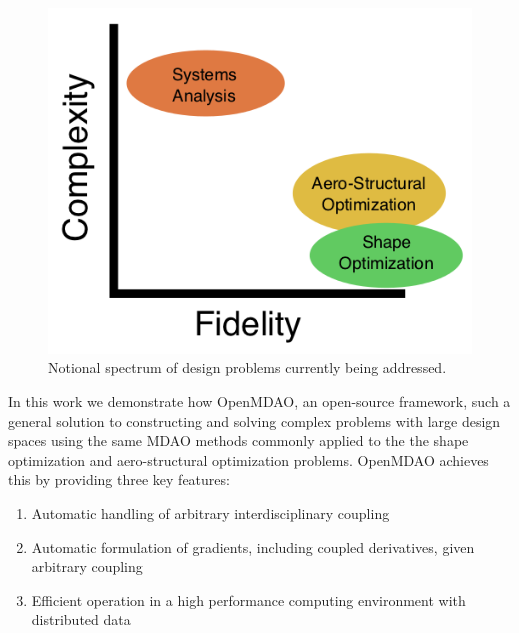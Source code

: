 \documentclass[]{aiaa-tc} %
\begin{document}
    \begin{figure}[!hbt]\begin{center}
      \includegraphics[width=.5\textwidth]{images/complexity_cartoon}
      \caption{ Notional spectrum of design problems currently being addressed. \label{fig:complexity_cartoon}}
    \end{center}\end{figure}

    In this work we demonstrate how OpenMDAO, an open-source framework, such a general
    solution to constructing and solving complex problems with large design spaces using the
    same MDAO methods commonly applied to the the shape optimization and aero-structural optimization
    problems. OpenMDAO achieves this by providing three key features:

    \begin{enumerate}
      \item Automatic handling of arbitrary interdisciplinary coupling
      \item Automatic formulation of gradients, including coupled derivatives, given arbitrary coupling
      \item Efficient operation in a high performance computing environment with distributed data
    \end{enumerate}

\end{document}
